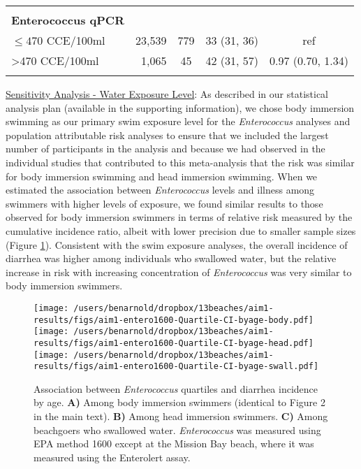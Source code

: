 \documentclass[12pt]{article}\usepackage[]{graphicx}\usepackage[]{color}
\begin{document}
\begin{table}[h!tb]
\begin{center}
\begin{footnotesize}
\begin{tabular}{l rc c c}
& \\
\textbf{Enterococcus qPCR} \\
 $\leq470$ CCE/100ml & 23,539 &    779 & 33 (31, 36) & ref \\ 
  >470 CCE/100ml &  1,065 &     45 & 42 (31, 57) & 0.97 (0.70, 1.34) \\ 
  
& \\
\hline
\end{tabular}
\end{footnotesize}
\end{center}
\end{table}



\clearpage
\underline{Sensitivity Analysis - Water Exposure Level}: As described in our statistical analysis plan (available in the supporting information), we chose body immersion swimming as our primary swim exposure level for the \emph{Enterococcus} analyses and population attributable risk analyses to ensure that we included the largest number of participants in the analysis and because we had observed in the individual studies that contributed to this meta-analysis that the risk was similar for body immersion swimming and head immersion swimming. When we estimated the association between \emph{Enterococcus} levels and illness among swimmers with higher levels of exposure, we found similar results to those observed for body immersion swimmers in terms of relative risk measured by the cumulative incidence ratio, albeit with lower precision due to smaller sample sizes (Figure \ref{fig:enterosens}). Consistent with the swim exposure analyses, the overall incidence of diarrhea was higher among individuals who swallowed water, but the relative increase in risk with increasing concentration of \emph{Enterococcus} was very similar to body immersion swimmers.

\begin{figure}[h!tb]
\begin{center}
\texttt{[image: /users/benarnold/dropbox/13beaches/aim1-results/figs/aim1-entero1600-Quartile-CI-byage-body.pdf]} \\
\texttt{[image: /users/benarnold/dropbox/13beaches/aim1-results/figs/aim1-entero1600-Quartile-CI-byage-head.pdf]} \\
\texttt{[image: /users/benarnold/dropbox/13beaches/aim1-results/figs/aim1-entero1600-Quartile-CI-byage-swall.pdf]}
\caption{Association between \emph{Enterococcus} quartiles and diarrhea incidence by age. \textbf{A)} Among body immersion swimmers (identical to Figure 2 in the main text). \textbf{B)} Among head immersion swimmers. \textbf{C)} Among beachgoers who swallowed water. \emph{Enterococcus} was measured using EPA method 1600 except at the Mission Bay beach, where it was measured using the Enterolert assay. \label{fig:enterosens}}
\end{center}
\end{figure}
\end{document}
